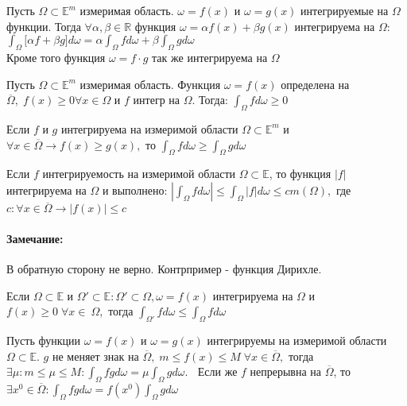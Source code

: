 \documentclass{letnab}
\begin{document}
\begin{theorem}
	Пусть $\Omega\subset \mathbb{E}^m$ измеримая область. $\omega=f(x)$  и $\omega=g(x)$ интегрируемые на $\Omega$ функции. Тогда $\forall \alpha, \beta\in\mathbb{R} $ функция $\omega= \alpha f(x) + \beta g(x) $ интегрируема на $\Omega$: \\
	$\int_\Omega \big[\alpha f + \beta g \big]d\omega = \alpha \int_\Omega fd\omega + \beta \int_\Omega gd\omega$  \\
	Кроме того функция $\omega=f\cdot g $ так же интегрируема на $\Omega$ 
\end{theorem}

\begin{theorem}
	Пусть $\Omega\subset \mathbb{E}^m$ измеримая область. Функция $\omega=f(x)$ определена на $\overline{\Omega}, \; f(x)\geq 0 \forall x\in \Omega$ и $f$ интегр на $\Omega$. Тогда: $\int_\Omega fd\omega\geq 0  $
\end{theorem}

\begin{theorem}
	Если $f$ и $g$ интегрируема на измеримой области $\Omega \subset \mathbb{E}^m $ и $\forall x\in \overline{\Omega} \rightarrow f(x) \geq g(x), $ то $ \int_\Omega fd\omega\geq \int_\Omega gd\omega$ 
\end{theorem}

\begin{theorem}
	Если $f$  интегрируемость на измеримой области $\Omega \subset \mathbb{E} $, то функция $|f|$ интегрируема на $\Omega$ и выполнено: $|\int_\Omega fd\omega|\leq \int_\Omega|f|d\omega \leq cm(\Omega),  $ где $c:\forall x\in \overline{\Omega} \rightarrow |f(x)|\leq c $
\end{theorem}

\paragraph{Замечание:}\vspace{-10pt}
В обратную сторону не верно. Контрпример - функция Дирихле.

\begin{theorem}
	Если $\Omega\subset \mathbb{E}$ и $\Omega'\subset \mathbb{E}: \Omega'\subset \Omega, \omega=f(x) $ интегрируема на $\Omega$ и $f(x)\geq 0 \;\forall x\in\ \Omega,$ тогда $\int_{\Omega'}fd\omega \leq \int_\Omega f d\omega $
\end{theorem}

\begin{theorem}
	Пусть функции $\omega=f(x) $ и  $\omega=g(x) $ интегрируемы на измеримой области $\Omega\subset \mathbb{E}$. $g$ не меняет знак на $\overline{\Omega},\; m\leq f(x) \leq M\; \forall x \in \overline{\Omega},$ тогда $\exists \mu: m\leq \mu \leq M:  \int_\Omega fgd\omega = \mu \int_\Omega gd\omega.\;\; $	Если  же $f$ непрерывна на $\overline{\Omega}$, то $\exists x^0 \in \overline{\Omega}:  \int_\Omega fgd\omega = f(x^0) \int_\Omega gd\omega$ 
\end{theorem}
\end{document}
